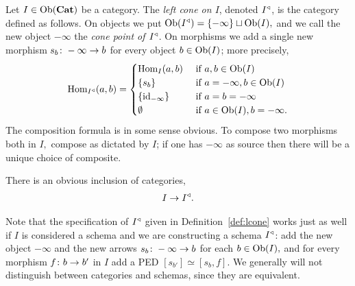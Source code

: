\documentclass[CT4S-EN-RU]{subfiles}
\begin{document}
\begin{definitionENG}\label{def:lcone}
Let $I\in\textnormal{Ob}({\mathbf{Cat}})$ be a category. The {\em left cone on $I$}, denoted $I^\triangleleft$, is the category defined as follows. On objects we put $\textnormal{Ob}(I^\triangleleft)=\{-\infty\}\sqcup\textnormal{Ob}(I),$ and we call the new object $-\infty$ the {\em cone point of $I^\triangleleft$}. On morphisms we add a single new morphism $s_b\colon-\infty\rightarrow b$ for every object $b\in\textnormal{Ob}(I)$; more precisely,
$$\textnormal{Hom}_{I^\triangleleft}(a,b)=
\begin{cases}
\textnormal{Hom}_I(a,b)&\textnormal{ if }a,b\in\textnormal{Ob}(I)\\
\{s_b\}&\textnormal{ if }a=-\infty, b\in\textnormal{Ob}(I)\\
\{\textnormal{id}_{-\infty}\}&\textnormal{ if } a=b=-\infty\\
\emptyset&\textnormal{ if } a\in\textnormal{Ob}(I), b=-\infty.
\end{cases}$$
The composition formula is in some sense obvious. To compose two morphisms both in $I,$ compose as dictated by $I$; if one has $-\infty$ as source then there will be a unique choice of composite.

There is an obvious inclusion of categories,
\begin{align}\label{dia:inclusion into cone}
I\rightarrow I^\triangleleft.
\end{align}
\end{definitionENG}

\begin{definitionRUS}\label{def:lcone}
\end{definitionRUS}

\begin{remarkENG}\label{rem:schemas are cats!}
Note that the specification of $I^\triangleleft$ given in Definition~\ref{def:lcone} works just as well if $I$ is considered a schema and we are constructing a schema $I^\triangleleft$: add the new object $-\infty$ and the new arrows $s_b\colon-\infty\rightarrow b$ for each $b\in\textnormal{Ob}(I),$ and for every morphism $f\colon b\rightarrow b'$ in $I$ add a PED $[s_{b'}]\simeq[s_b,f].$ We generally will not distinguish between categories and schemas, since they are equivalent.
\end{remarkENG}

\begin{remarkRUS}\label{rem:schemas are cats!}
\end{remarkRUS}
\end{document}
